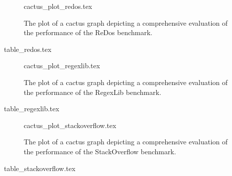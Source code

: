 \begin{figure}
  {cactus_plot_redos.tex}
  \caption{The plot of a cactus graph depicting a comprehensive evaluation of the performance of the ReDos benchmark.}
  \label{fig:cactus_redos}
\end{figure}
\begin{table}
  {table_redos.tex}
  \caption{Detailed results for the ReDos benchmark.}
  \label{tab:results_redos}
\end{table}

\begin{figure}
  {cactus_plot_regexlib.tex}
  \caption{The plot of a cactus graph depicting a comprehensive evaluation of the performance of the RegexLib benchmark.}
  \label{fig:cactus_regexlib}
\end{figure}
\begin{table}
  {table_regexlib.tex}
  \caption{Detailed results for the RegexLib benchmark.}
  \label{tab:results_regexlib}
\end{table}

\begin{figure}
  {cactus_plot_stackoverflow.tex}
  \caption{The plot of a cactus graph depicting a comprehensive evaluation of the performance of the StackOverflow benchmark.}
  \label{fig:cactus_stackoverflow}
\end{figure}
\begin{table}
  {table_stackoverflow.tex}
  \caption{Detailed results for the StackOverflow benchmark.}
  \label{tab:results_stackoverflow}
\end{table}
